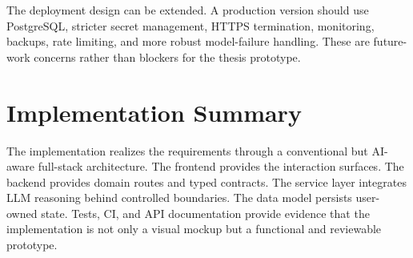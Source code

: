 The deployment design can be extended. A production version should use PostgreSQL, stricter secret management, HTTPS termination, monitoring, backups, rate limiting, and more robust model-failure handling. These are future-work concerns rather than blockers for the thesis prototype.

\section{Implementation Summary}

The implementation realizes the requirements through a conventional but AI-aware full-stack architecture. The frontend provides the interaction surfaces. The backend provides domain routes and typed contracts. The service layer integrates LLM reasoning behind controlled boundaries. The data model persists user-owned state. Tests, CI, and API documentation provide evidence that the implementation is not only a visual mockup but a functional and reviewable prototype.

